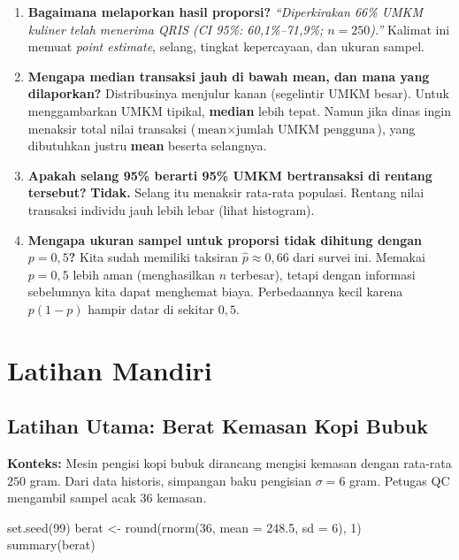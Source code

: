 \documentclass[
  indonesian,
  letterpaper,
]{book}
\newenvironment{Shaded}{\begin{snugshade}}{\end{snugshade}}
\newcommand{\AttributeTok}[1]{\textcolor[rgb]{0.40,0.45,0.13}{#1}}
\newcommand{\DecValTok}[1]{\textcolor[rgb]{0.68,0.00,0.00}{#1}}
\newcommand{\FloatTok}[1]{\textcolor[rgb]{0.68,0.00,0.00}{#1}}
\newcommand{\FunctionTok}[1]{\textcolor[rgb]{0.28,0.35,0.67}{#1}}
\newcommand{\NormalTok}[1]{\textcolor[rgb]{0.00,0.23,0.31}{#1}}
\newcommand{\OtherTok}[1]{\textcolor[rgb]{0.00,0.23,0.31}{#1}}
\providecommand{\tightlist}{%
  \setlength{\itemsep}{0pt}\setlength{\parskip}{0pt}}
\begin{document}
\begin{enumerate}
\def\labelenumi{\arabic{enumi}.}
\tightlist
\item
  \textbf{Bagaimana melaporkan hasil proporsi?} \emph{``Diperkirakan
  66\% UMKM kuliner telah menerima QRIS (CI 95\%: 60,1\%--71,9\%;
  \(n = 250\)).''} Kalimat ini memuat \emph{point estimate}, selang,
  tingkat kepercayaan, dan ukuran sampel.
\item
  \textbf{Mengapa median transaksi jauh di bawah mean, dan mana yang
  dilaporkan?} Distribusinya menjulur kanan (segelintir UMKM besar).
  Untuk menggambarkan UMKM tipikal, \textbf{median} lebih tepat. Namun
  jika dinas ingin menaksir total nilai transaksi
  (\(\text{mean} \times \text{jumlah UMKM pengguna}\)), yang dibutuhkan
  justru \textbf{mean} beserta selangnya.
\item
  \textbf{Apakah selang 95\% berarti 95\% UMKM bertransaksi di rentang
  tersebut?} \textbf{Tidak.} Selang itu menaksir rata-rata populasi.
  Rentang nilai transaksi individu jauh lebih lebar (lihat histogram).
\item
  \textbf{Mengapa ukuran sampel untuk proporsi tidak dihitung dengan
  \(p = 0{,}5\)?} Kita sudah memiliki taksiran
  \(\hat{p} \approx 0{,}66\) dari survei ini. Memakai \(p = 0{,}5\)
  lebih aman (menghasilkan \(n\) terbesar), tetapi dengan informasi
  sebelumnya kita dapat menghemat biaya. Perbedaannya kecil karena
  \(p(1 - p)\) hampir datar di sekitar \(0{,}5\).
\end{enumerate}

\section{Latihan Mandiri}\label{latihan-mandiri-5}

\subsection{Latihan Utama: Berat Kemasan Kopi
Bubuk}\label{latihan-utama-berat-kemasan-kopi-bubuk}

\textbf{Konteks:} Mesin pengisi kopi bubuk dirancang mengisi kemasan
dengan rata-rata \(250\) gram. Dari data historis, simpangan baku
pengisian \(\sigma = 6\) gram. Petugas QC mengambil sampel acak \(36\)
kemasan.

\begin{Shaded}
\begin{Highlighting}[]
\FunctionTok{set.seed}\NormalTok{(}\DecValTok{99}\NormalTok{)}
\NormalTok{berat }\OtherTok{\textless{}{-}} \FunctionTok{round}\NormalTok{(}\FunctionTok{rnorm}\NormalTok{(}\DecValTok{36}\NormalTok{, }\AttributeTok{mean =} \FloatTok{248.5}\NormalTok{, }\AttributeTok{sd =} \DecValTok{6}\NormalTok{), }\DecValTok{1}\NormalTok{)}
\FunctionTok{summary}\NormalTok{(berat)}
\end{Highlighting}
\end{Shaded}
\end{document}
